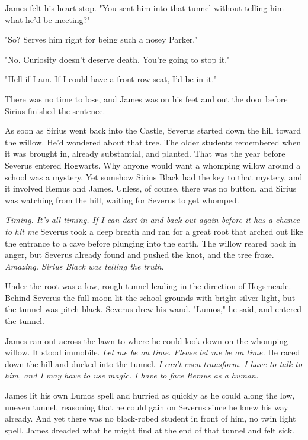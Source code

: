 James felt his heart stop. "You sent him into that tunnel without telling him what he'd be meeting?"

"So? Serves him right for being such a nosey Parker."

"No. Curiosity doesn't deserve death. You're going to stop it."

"Hell if I am. If I could have a front row seat, I'd be in it."

There was no time to lose, and James was on his feet and out the door before Sirius finished the sentence.

As soon as Sirius went back into the Castle, Severus started down the hill toward the willow. He'd wondered about that tree. The older students remembered when it was brought in, already substantial, and planted. That was the year before Severus entered Hogwarts. Why anyone would want a whomping willow around a school was a mystery. Yet somehow Sirius Black had the key to that mystery, and it involved Remus and James. Unless, of course, there was no button, and Sirius was watching from the hill, waiting for Severus to get whomped.

\emph{Timing. It's all timing. If I can dart in and back out again before it has a chance to hit me{\el}} Severus took a deep breath and ran for a great root that arched out like the entrance to a cave before plunging into the earth. The willow reared back in anger, but Severus already found and pushed the knot, and the tree froze. \emph{Amazing. Sirius Black was telling the truth.}

Under the root was a low, rough tunnel leading in the direction of Hogsmeade. Behind Severus the full moon lit the school grounds with bright silver light, but the tunnel was pitch black. Severus drew his wand. "Lumos," he said, and entered the tunnel.

James ran out across the lawn to where he could look down on the whomping willow. It stood immobile. \emph{Let me be on time. Please let me be on time.} He raced down the hill and ducked into the tunnel. \emph{I can't even transform. I have to talk to him, and I may have to use magic. I have to face Remus as a human.}

James lit his own Lumos spell and hurried as quickly as he could along the low, uneven tunnel, reasoning that he could gain on Severus since he knew his way already. And yet there was no black-robed student in front of him, no twin light spell. James dreaded what he might find at the end of that tunnel and felt sick.

